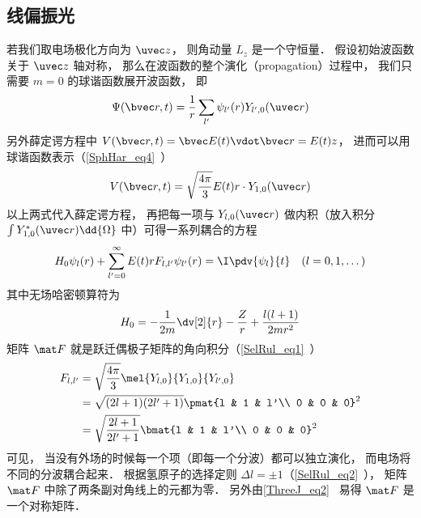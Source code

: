 \subsection{线偏振光}
若我们取电场极化方向为 $\uvec z$， 则角动量 $L_z$ 是一个守恒量． 假设初始波函数关于 $\uvec z$ 轴对称， 那么在波函数的整个演化（propagation）过程中， 我们只需要 $m=0$ 的球谐函数展开波函数， 即
\begin{equation}
\Psi(\bvec r, t) = \frac{1}{r}\sum_{l'} \psi_{l'}(r) Y_{l', 0}(\uvec r)
\end{equation}
另外薛定谔方程中 $V(\bvec r, t) = \bvec E(t) \vdot \bvec r = E(t) z$， 进而可以用球谐函数表示（\autoref{SphHar_eq4}~）
\begin{equation}
V(\bvec r, t) = \sqrt{\frac{4\pi}{3}} E(t) r \cdot Y_{1,0}(\uvec r)
\end{equation}
以上两式代入薛定谔方程， 再把每一项与 $Y_{l,0}(\uvec r)$ 做内积（放入积分 $\int Y_{1,0}^*(\uvec r) \dd{\Omega}$ 中）可得一系列耦合的方程
\begin{equation}\label{HyTDSE_eq4}
H_0 \psi_{l}(r) + \sum_{l' = 0}^{\infty} E(t)rF_{l, l'} \psi_{l'}(r) = \I \pdv{\psi_{l}}{t} \quad (l=0,1,\dots)
\end{equation}
其中无场哈密顿算符为
\begin{equation}
H_0 = -\frac{1}{2m} \dv[2]{r} -\frac{Z}{r} + \frac{l(l+1)}{2mr^2}
\end{equation}
矩阵 $\mat F$ 就是跃迁偶极子矩阵的角向积分（\autoref{SelRul_eq1}~）
\begin{equation}
\begin{aligned}
F_{l,l'} &= \sqrt{\frac{4\pi}{3}} \mel{Y_{l,0}}{Y_{1,0}}{Y_{l',0}}\\
&= \sqrt{(2l+1)(2l'+1)} \pmat{l & 1 & l'\\ 0 & 0 & 0}^2\\
&= \sqrt{\frac{2l+1}{2l'+1}} \bmat{l & 1 & l'\\ 0 & 0 & 0}^2
\end{aligned}
\end{equation}
可见， 当没有外场的时候每一个项（即每一个分波）都可以独立演化， 而电场将不同的分波耦合起来． 根据氢原子的选择定则 $\Delta l = \pm 1$（\autoref{SelRul_eq2}~）， 矩阵 $\mat F$ 中除了两条副对角线上的元都为零． 另外由\autoref{ThreeJ_eq2}~ 易得 $\mat F$ 是一个对称矩阵．

